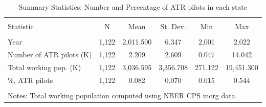 
\begin{table}[!htbp] \centering 
  \caption{Summary Statistics: Number and Percentage of ATR pilots in each state} 
  \label{} 
\small 
\begin{tabular}{@{\extracolsep{5pt}}lccccc} 
\\[-1.8ex]\hline 
\hline \\[-1.8ex] 
Statistic & \multicolumn{1}{c}{N} & \multicolumn{1}{c}{Mean} & \multicolumn{1}{c}{St. Dev.} & \multicolumn{1}{c}{Min} & \multicolumn{1}{c}{Max} \\ 
\hline \\[-1.8ex] 
Year & 1,122 & 2,011.500 & 6.347 & 2,001 & 2,022 \\ 
Number of ATR pilots (K) & 1,122 & 2.209 & 2.609 & 0.047 & 14.042 \\ 
Total working pop. (K) & 1,122 & 3,036.595 & 3,356.708 & 271.122 & 19,451.300 \\ 
\%, ATR pilots & 1,122 & 0.082 & 0.070 & 0.015 & 0.544 \\ 
\hline \\[-1.8ex] 
\multicolumn{6}{l}{Notes: Total working population computed using NBER CPS morg data.} \\ 
\end{tabular} 
\end{table} 
